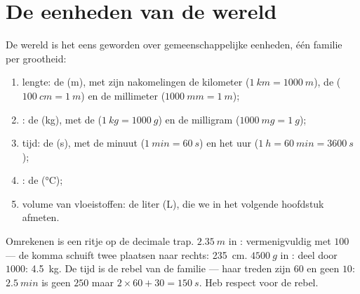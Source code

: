 \section{De eenheden van de wereld}

\begin{definition}\label{def:g6:measurement-in-science:units}
De wereld is het eens geworden over gemeenschappelijke
eenheden, één familie per grootheid:
\begin{enumerate}
  \item lengte: de \emph{} (\unit{m}), met zijn nakomelingen de
        kilometer ($\qty{1}{km} = \qty{1000}{m}$), de
         ($\qty{100}{cm} = \qty{1}{m}$) en de millimeter
        ($\qty{1000}{mm} = \qty{1}{m}$);
  \item {}: de \emph{} (\unit{kg}), met de 
        ($\qty{1}{kg} = \qty{1000}{g}$) en de milligram
        ($\qty{1000}{mg} = \qty{1}{g}$);
  \item tijd: de \emph{} (\unit{s}), met de minuut
        ($\qty{1}{min} = \qty{60}{s}$) en het uur
        ($\qty{1}{h} = \qty{60}{min} = \qty{3600}{s}$);
  \item {}: de  (\unit{\celsius});
  \item volume van vloeistoffen: de liter (\unit{L}), die we in het
        volgende hoofdstuk afmeten.
\end{enumerate}
\end{definition}

\begin{example}\label{ex:g6:measurement-in-science:convert}
Omrekenen is een ritje op de decimale trap. $\qty{2.35}{m}$ in
: vermenigvuldig met $100$ --- de komma schuift twee
plaatsen naar rechts: \qty{235}{cm}. $\qty{4500}{g}$ in
: deel door $1000$: \qty{4.5}{kg}. De tijd is de rebel van de
familie --- haar treden zijn $60$ en geen $10$: $\qty{2.5}{min}$ is
geen $250$  maar $2 \times 60 + 30 = \qty{150}{s}$. Heb
respect voor de rebel.
\end{example}

